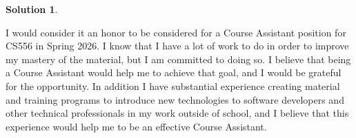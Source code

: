\documentclass[11pt]{article}
\theoremstyle{definition}
\newtheorem*{solution}{Solution}
\begin{document}
\begin{solution}
\end{solution}
I would consider it an honor to be considered for a Course Assistant position for CS556 in Spring 2026.  I know that I have a 
lot of work to do in order to improve my mastery of the material, but I am committed to doing so.  I believe that being a Course Assistant
would help me to achieve that goal, and I would be grateful for the opportunity.  In addition I have substantial experience creating material
and training programs to introduce new technologies to software developers and other technical professionals in my work outside of school, and I believe that
this experience would help me to be an effective Course Assistant.
\end{document}
